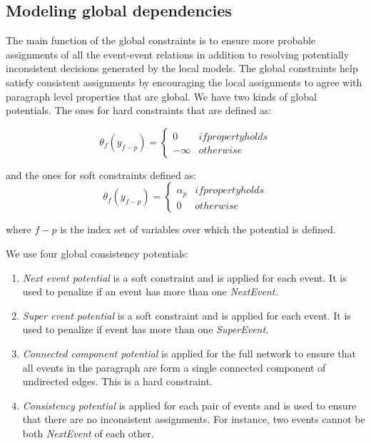 \subsection{Modeling global dependencies}
The main function of the global constraints is to ensure more probable assignments of all the event-event relations in addition to resolving potentially inconsistent decisions generated by the local models. The global constraints help satisfy consistent assignments by encouraging the local assignments to agree with paragraph level properties that are global. We have two kinds of global potentials. The ones for hard constraints that are defined as:

\begin{equation}
\theta_f(y_{f-p}) = 
\left\{\begin{matrix}
0 & if property holds\\ 
-\infty & otherwise
\end{matrix}\right.
\end{equation}

and the ones for soft constraints defined as:
\begin{equation}
\theta_f(y_{f-p}) = 
\left\{\begin{matrix}
\alpha_p & if property holds\\ 
0 & otherwise
\end{matrix}\right.
\end{equation}


where $f-p$ is the index set of variables over which the potential is defined.

We use four global consistency potentials:

\begin{enumerate}
\item {\em Next event potential} is a soft constraint and is applied for each event. It is used to penalize if an event has more than one {\em NextEvent.}
\item {\em Super event potential} is a soft constraint and is applied for each event. It is used to penalize if event has more than one {\em SuperEvent.}
\item {\em Connected component potential} is applied for the full network to ensure that all events in the paragraph are form a single connected component of undirected edges. This is a hard constraint.
\item {\em Consistency potential} is applied for each pair of events and is used to ensure that there are no inconsistent assignments. For instance, two events cannot be both {\em NextEvent} of each other.
\end{enumerate}

